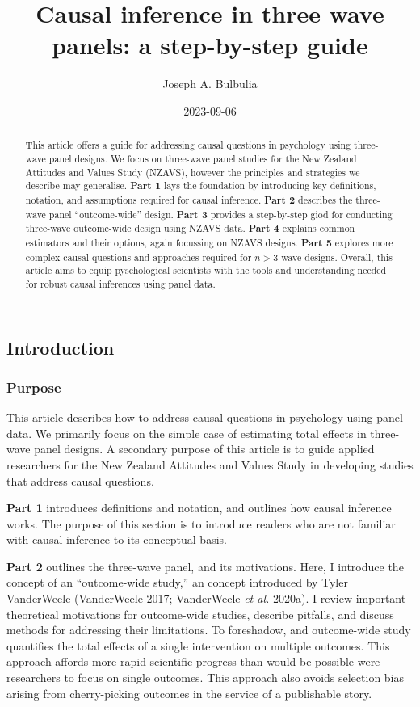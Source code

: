 \documentclass[
  singlecolumn]{article}
\title{Causal inference in three wave panels: a step-by-step guide}
\author{Joseph A. Bulbulia}
\affil{%
                  Victoria University of Wellington, New Zealand, School
                  of Psychology, Centre for Applied Cross-Cultural
                  Research
              }
\date{2023-09-06}
\begin{document}
\maketitle
\begin{abstract}
This article offers a guide for addressing causal questions in
psychology using three-wave panel designs. We focus on three-wave panel
studies for the New Zealand Attitudes and Values Study (NZAVS), however
the principles and strategies we describe may generalise. \textbf{Part
1} lays the foundation by introducing key definitions, notation, and
assumptions required for causal inference. \textbf{Part 2} describes the
three-wave panel ``outcome-wide'' design. \textbf{Part 3} provides a
step-by-step giod for conducting three-wave outcome-wide design using
NZAVS data. \textbf{Part 4} explains common estimators and their
options, again focussing on NZAVS designs. \textbf{Part 5} explores more
complex causal questions and approaches required for \(n > 3\) wave
designs. Overall, this article aims to equip pyschological scientists
with the tools and understanding needed for robust causal inferences
using panel data.
\end{abstract}
\subsection{Introduction}\label{introduction}

\subsubsection{Purpose}\label{purpose}

This article describes how to address causal questions in psychology
using panel data. We primarily focus on the simple case of estimating
total effects in three-wave panel designs. A secondary purpose of this
article is to guide applied researchers for the New Zealand Attitudes
and Values Study in developing studies that address causal questions.

\textbf{Part 1} introduces definitions and notation, and outlines how
causal inference works. The purpose of this section is to introduce
readers who are not familiar with causal inference to its conceptual
basis.

\textbf{Part 2} outlines the three-wave panel, and its motivations.
Here, I introduce the concept of an ``outcome-wide study,'' an concept
introduced by Tyler VanderWeele
(\hyperref[ref-vanderweele2017a]{VanderWeele 2017};
\hyperref[ref-vanderweele2020a]{VanderWeele \emph{et al.} 2020a}). I
review important theoretical motivations for outcome-wide studies,
describe pitfalls, and discuss methods for addressing their limitations.
To foreshadow, and outcome-wide study quantifies the total effects of a
single intervention on multiple outcomes. This approach affords more
rapid scientific progress than would be possible were researchers to
focus on single outcomes. This approach also avoids selection bias
arising from cherry-picking outcomes in the service of a publishable
story.
\end{document}
